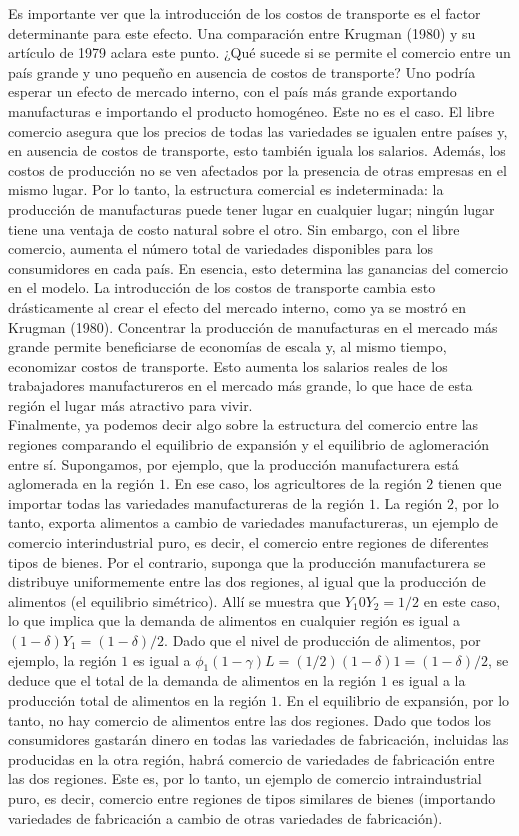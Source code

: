 Es importante ver que la introducción de los costos de transporte es el factor determinante para este efecto. Una comparación entre Krugman (1980) y su artículo de 1979 aclara este punto. ¿Qué sucede si se permite el comercio entre un país grande y uno pequeño en ausencia de costos de transporte? Uno podría esperar un efecto de mercado interno, con el país más grande exportando manufacturas e importando el producto homogéneo. Este no es el caso. El libre comercio asegura que los precios de todas las variedades se igualen entre países y, en ausencia de costos de transporte, esto también iguala los salarios. Además, los costos de producción no se ven afectados por la presencia de otras empresas en el mismo lugar. Por lo tanto, la estructura comercial es indeterminada: la producción de manufacturas puede tener lugar en cualquier lugar; ningún lugar tiene una ventaja de costo natural sobre el otro. Sin embargo, con el libre comercio, aumenta el número total de variedades disponibles para los consumidores en cada país. En esencia, esto determina las ganancias del comercio en el modelo. La introducción de los costos de transporte cambia esto drásticamente al crear el efecto del mercado interno, como ya se mostró en Krugman (1980). Concentrar la producción de manufacturas en el mercado más grande permite beneficiarse de economías de escala y, al mismo tiempo, economizar costos de transporte. Esto aumenta los salarios reales de los trabajadores manufactureros en el mercado más grande, lo que hace de esta región el lugar más atractivo para vivir.\\
Finalmente, ya podemos decir algo sobre la estructura del comercio entre las regiones comparando el equilibrio de expansión y el equilibrio de aglomeración entre sí. Supongamos, por ejemplo, que la producción manufacturera está aglomerada en la región $1$. En ese caso, los agricultores de la región $2$ tienen que importar todas las variedades manufactureras de la región $1$. La región $2$, por lo tanto, exporta alimentos a cambio de variedades manufactureras, un ejemplo de comercio interindustrial puro, es decir, el comercio entre regiones de diferentes tipos de bienes. Por el contrario, suponga que la producción manufacturera se distribuye uniformemente entre las dos regiones, al igual que la producción de alimentos (el equilibrio simétrico). Allí se muestra que $Y_1 0 Y_2 = 1/2$ en este caso, lo que implica que la demanda de alimentos en cualquier región es igual a $(1-\delta)Y_1 = (1-\delta)/2$. Dado que el nivel de producción de alimentos, por ejemplo, la región $1$ es igual a $\phi_1(1-\gamma)L = (1/2)(1-\delta)1 = (1-\delta)/2$, se deduce que el total de la demanda de alimentos en la región $1$ es igual a la producción total de alimentos en la región $1$. En el equilibrio de expansión, por lo tanto, no hay comercio de alimentos entre las dos regiones. Dado que todos los consumidores gastarán dinero en todas las variedades de fabricación, incluidas las producidas en la otra región, habrá comercio de variedades de fabricación entre las dos regiones. Este es, por lo tanto, un ejemplo de comercio intraindustrial puro, es decir, comercio entre regiones de tipos similares de bienes (importando variedades de fabricación a cambio de otras variedades de fabricación). 

